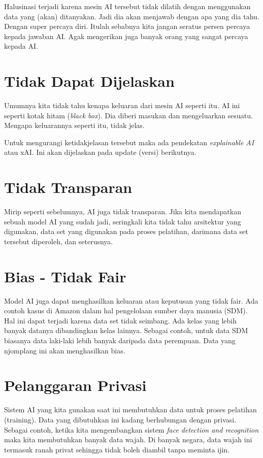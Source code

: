 Halusinasi terjadi karena mesin AI tersebut tidak dilatih dengan menggunakan
data yang (akan) ditanyakan. Jadi dia akan menjawab dengan apa yang
dia tahu. Dengan super percaya diri.
Itulah sebabnya kita jangan seratus persen percaya kepada jawaban AI.
Agak mengerikan juga banyak orang yang sangat percaya kepada AI.

\section{Tidak Dapat Dijelaskan}
Umumnya kita tidak tahu kenapa keluaran dari mesin AI seperti itu.
AI ini seperti kotak hitam (\emph{black box}).
Dia diberi masukan dan mengeluarkan sesuatu.
Mengapa keluarannya seperti itu, tidak jelas.

Untuk mengurangi ketidakjelasan tersebut maka ada pendekatan
\emph{explainable AI} atau xAI.
Ini akan dijelaskan pada update (versi) berikutnya.

\section{Tidak Transparan}
Mirip seperti sebelumnya, AI juga tidak transparan.
Jika kita mendapatkan sebuah model AI yang sudah jadi,
seringkali kita tidak tahu arsitektur yang digunakan,
data set yang digunakan pada proses pelatihan,
darimana data set tersebut diperoleh, dan seterusnya.

\section{Bias - Tidak Fair}
Model AI juga dapat menghasilkan keluaran atau keputusan yang tidak fair.
Ada contoh kasus di Amazon dalam hal pengelolaan sumber daya manusia (SDM).
Hal ini dapat terjadi karena data set tidak seimbang.
Ada kelas yang lebih banyak datanya dibandingkan kelas lainnya.
Sebagai contoh, untuk data SDM biasanya data laki-laki lebih banyak
daripada data perempuan. Data yang njomplang ini akan menghasilkan bias.

\section{Pelanggaran Privasi}
Sistem AI yang kita gunakan saat ini membutuhkan data untuk proses pelatihan
(training). Data yang dibutuhkan ini kadang berhubungan 
dengan privasi.
Sebagai contoh, ketika kita mengembangkan sistem 
\emph{face detection and recognition} maka kita membutuhkan banyak 
data wajah. Di banyak negara, data wajah ini termasuk ranah privat
sehingga tidak boleh diambil tanpa meminta ijin.

